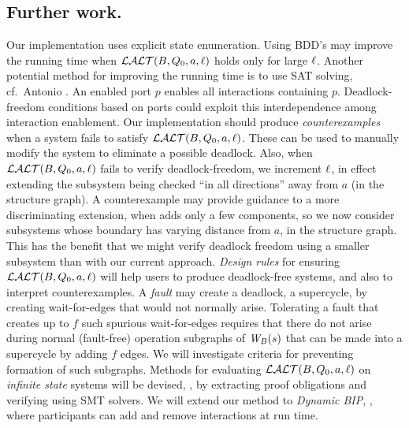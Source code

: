\subsection{Further work.} 
Our implementation uses explicit state enumeration. %
Using BDD's may improve the running time 
when $\mathcal{LALT}(B, Q_0, a, \ell)$ holds only for large $\ell$.
Another potential method for improving the running time is to use 
SAT solving, cf.\ Antonio \etal \cite{AGR16}.
%
%
An enabled port $p$ enables all interactions containing $p$.
Deadlock-freedom conditions based on ports could exploit
this interdependence among interaction enablement.
%
Our implementation should produce \emph{counterexamples} when a system fails to satisfy $\mathcal{LALT}(B, Q_0, a, \ell)$. These can be used to manually modify the system
to eliminate a possible deadlock.  Also, when $\mathcal{LALT}(B, Q_0, a, \ell)$ fails to verify deadlock-freedom, we increment $\ell$, in effect extending the
subsystem being checked ``in all directions'' away from $a$ (in the structure graph). A counterexample may provide guidance to a more discriminating
extension, when adds only a few components, so we now consider subsystems whose boundary has varying distance from $a$, in the structure graph. This
has the benefit that we might verify deadlock freedom using a smaller subsystem than with our current approach.
%
\emph{Design rules} for ensuring $\mathcal{LALT}(B, Q_0, a, \ell)$ will help users to
produce deadlock-free systems, and also to interpret counterexamples.
%
A \emph{fault} may create a deadlock,  \ie a supercycle, by creating 
wait-for-edges that would not normally arise.
Tolerating a fault that creates up to $f$ such spurious wait-for-edges 
requires that there do not arise during normal
(fault-free) operation subgraphs of $\mathit{W}_{B}({s})$ that can be made into a
supercycle by adding $f$ edges. 
We will investigate criteria for preventing formation of such subgraphs.
%
Methods for evaluating $\mathcal{LALT}(B, Q_0, a, \ell)$ on \emph{infinite state} systems will be
devised, \eg, by extracting proof obligations and verifying using SMT solvers.
%
We will extend our method to \emph{Dynamic BIP},
\cite{DBLP:conf/soco/BozgaJMS12}, where participants can add and remove
interactions at run time.


